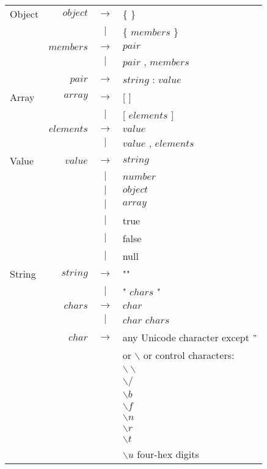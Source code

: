 \documentclass{article}
\begin{document}
\begin{small}

\centering

\begin{longtable}{ l r c l }

Object		&
$object$	& $ \rightarrow $ 	& \{ \}				\\
		&
 		& $ | $			& \{ $members$ \} 		\\
		&
$members$ 	& $ \rightarrow $	& $pair$			\\
		&
		& $ | $			& $pair$ , $members$ 		\\
		&
$pair$		& $ \rightarrow $	& $string$ : $value$ 		\\

Array		&
$array$		& $ \rightarrow $	& [ ]				\\
		&
		& $ | $			& [ $elements$ ]		\\
		&
$elements$ 	& $ \rightarrow $	& $value$			\\
		&
		& $ | $			& $value$ , $elements$		\\

Value		&
$value$		& $ \rightarrow $	& $string$			\\
		&
		& $ | $			& $number$			\\
		&
		& $ | $			& $object$			\\
		&
		& $ | $			& $array$			\\
		&
		& $ | $			& true				\\
		&
		& $ | $			& false				\\
		&
		& $ | $			& null				\\

String		&
$string$	& $ \rightarrow $	& ""				\\
		&
		& $ | $			& " $chars$ "			\\
		&
$chars$		& $ \rightarrow $	& $char$			\\
		&
		& $ | $			& $char$ $chars$		\\
		&
$char$		& $ \rightarrow $	& any Unicode character except $"$ \\ 
		&
		&			& or $\backslash$ or control characters: \\
		&
		&			& $\backslash\backslash$	\\
		&
		&			& $\backslash /$ 		\\
		&
		&			& $\backslash b$ 		\\
		&
		& 			& $\backslash f$ 		\\
		&
		&			& $\backslash n$		\\
		&
		& 			& $\backslash r$ 		\\
		&
		&			& $\backslash t$ 		\\
		&
		& 			& $\backslash u$ four-hex digits\\


\end{longtable}
\end{small}
\end{document}
